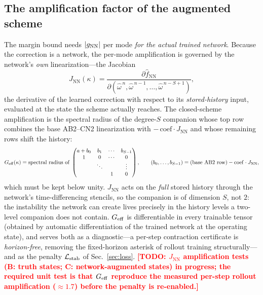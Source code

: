 \documentclass[11pt]{article}
\theoremstyle{plain}
\theoremstyle{definition}
\newcommand{\TODO}[1]{\textcolor{red}{\textbf{[TODO: #1]}}}
\begin{document}
\subsection{The amplification factor of the augmented scheme}
\label{sec:certificate}
The margin bound needs $|g_{\rm NN}|$ per mode \emph{for the actual trained
network}. Because the correction is a network, the per-mode amplification is
governed by the network's \emph{own} linearization---the Jacobian
\begin{equation}
J_{\mathrm{NN}}(\kappa)=\frac{\partial \hat f_{\mathrm{NN}}}
{\partial(\hat\omega^{\,n},\hat\omega^{\,n-1},\dots,\hat\omega^{\,n-S+1})},
\label{eq:jnn}
\end{equation}
the derivative of the learned correction with respect to its
\emph{stored-history} input, evaluated at the state the scheme actually
reaches. The closed-scheme amplification is the spectral radius of the
degree-$S$ companion whose top row combines the base AB2--CN2 linearization
with $-\,\mathrm{coef}\cdot J_{\mathrm{NN}}$ and whose remaining rows shift
the history:
\begin{equation}
G_{\rm eff}(\kappa)=\text{spectral radius of }
\begin{pmatrix}
a+b_0 & b_1 & \cdots & b_{S-1}\\
1 & 0 & \cdots & 0\\
 & \ddots & & \vdots\\
 & & 1 & 0
\end{pmatrix},\qquad
(b_0,\dots,b_{S-1})=(\text{base AB2 row})-\mathrm{coef}\cdot J_{\mathrm{NN}},
\label{eq:geff}
\end{equation}
which must be kept below unity. $J_{\mathrm{NN}}$ acts on the \emph{full}
stored history through the network's time-differencing stencils, so the
companion is of dimension $S$, not $2$: the instability the network can
create lives precisely in the history levels a two-level companion does not
contain. $G_{\rm eff}$ is differentiable in every trainable tensor (obtained
by automatic differentiation of the trained network at the operating state),
and serves both as a diagnostic---a per-step contraction certificate is
\emph{horizon-free}, removing the fixed-horizon asterisk of rollout training
structurally---and as the penalty $\mathcal L_{\rm stab}$ of
Sec.~\ref{sec:loss}. \TODO{$J_{\mathrm{NN}}$ amplification tests (B: truth
states; C: network-augmented states) in progress; the required unit test is
that $G_{\rm eff}$ reproduce the measured per-step rollout amplification
($\approx1.7$) before the penalty is re-enabled.}
\end{document}
